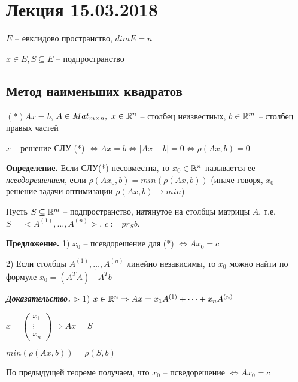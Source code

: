 \section{Лекция 15.03.2018}

$E$ -- евклидово пространство, $dimE = n$

$x \in E, S \subseteq E$ -- подпространство

\vspace{\baselineskip}
\subsection{Метод наименьших квадратов}

$(*) Ax = b$, $A \in Mat_{m \times n}, \ x \in \mathbb{R}^n$ -- столбец неизвестных, $b \in \mathbb{R}^m$ -- столбец правых частей

$x$ -- решение СЛУ (*) $\Leftrightarrow Ax = b \Leftrightarrow |Ax - b| = 0 \Leftrightarrow \rho (Ax, b) = 0$

\vspace{\baselineskip}
\textbf{Определение.} Если СЛУ(*) несовместна, то $x_0 \in \mathbb{R}^n$ называется ее \textit{псевдорешением}, если $\rho(Ax_0, b) = min (\rho(Ax, b))$ (иначе говоря, $x_0$ -- решение задачи оптимизации $\rho(Ax, b) \rightarrow min$)

\vspace{\baselineskip}
Пусть $S \subseteq \mathbb{R}^m$ -- подпространство, натянутое на столбцы матрицы $A$, т.е. $S = <A^{(1)}, \dots, A^{(n)}>$, $c := pr_S b$.

\vspace{\baselineskip}
\textbf{Предложение.} 1) $x_0$ -- псевдорешение для (*) $\Leftrightarrow Ax_0 = c$

2) Если столбцы $A^{(1)}, \dots, A^{(n)}$ линейно независимы, то $x_0$ можно найти по формуле $x_0 = (A^T A)^{-1} A^T b$

\vspace{\baselineskip}
\textbf{\textit{Доказательство.}} $\rhd$ 1) $x \in \mathbb{R}^n \Rightarrow Ax = x_1 A^{(1)} + \dots + x_n A^{(n)}$

$x = \begin{pmatrix} x_1 \\ \vdots \\ x_n \end{pmatrix} \Rightarrow Ax = S$

$min( \rho (Ax, b)) = \rho (S, b)$

\vspace{\baselineskip}
По предыдущей теореме получаем, что $x_0$ -- псведорешение $\Leftrightarrow Ax_0 = c$


